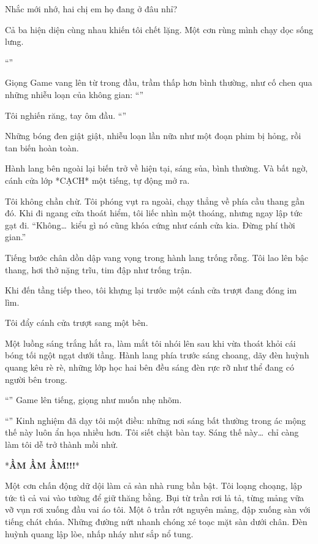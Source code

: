 \documentclass[../main.tex]{subfiles}
\begin{document}
Nhắc mới nhớ, hai chị em họ đang ở đâu nhỉ?

Cả ba hiện diện cùng nhau khiến tôi chết lặng. Một cơn rùng mình chạy dọc sống lưng.

``''

Giọng Game vang lên từ trong đầu, trầm thấp hơn bình thường, như cố chen qua những nhiễu loạn của không gian: ``''

Tôi nghiến răng, tay ôm đầu. ``''

Những bóng đen giật giật, nhiễu loạn lần nữa như một đoạn phim bị hỏng, rồi tan biến hoàn toàn.

Hành lang bên ngoài lại biến trở về hiện tại, sáng sủa, bình thường. Và bất ngờ, cánh cửa lớp *CẠCH* một tiếng, tự động mở ra.

Tôi không chần chừ. Tôi phóng vụt ra ngoài, chạy thẳng về phía cầu thang gần đó. Khi đi ngang cửa thoát hiểm, tôi liếc nhìn một thoáng, nhưng ngay lập tức gạt đi. ``Không\dots\ kiểu gì nó cũng khóa cứng như cánh cửa kia. Đừng phí thời gian.''

Tiếng bước chân dồn dập vang vọng trong hành lang trống rỗng. Tôi lao lên bậc thang, hơi thở nặng trĩu, tim đập như trống trận.

Khi đến tầng tiếp theo, tôi khựng lại trước một cánh cửa trượt đang đóng im lìm.

Tôi đẩy cánh cửa trượt sang một bên.

Một luồng sáng trắng hắt ra, làm mắt tôi nhói lên sau khi vừa thoát khỏi cái bóng tối ngột ngạt dưới tầng. Hành lang phía trước sáng choang, dãy đèn huỳnh quang kêu rè rè, những lớp học hai bên đều sáng đèn rực rỡ như thể đang có người bên trong.

``'' Game lên tiếng, giọng như muốn nhẹ nhõm.

``'' Kinh nghiệm đã dạy tôi một điều: những nơi sáng bất thường trong ác mộng thế này luôn ẩn họa nhiều hơn. Tôi siết chặt bàn tay. Sáng thế này\dots\ chỉ càng làm tôi dễ trở thành mồi nhử.

*\textbf{ẦM ẦM ẦM!!!}*

Một cơn chấn động dữ dội làm cả sàn nhà rung bần bật. Tôi loạng choạng, lập tức tì cả vai vào tường để giữ thăng bằng. Bụi từ trần rơi lả tả, từng mảng vữa vỡ vụn rơi xuống đầu vai áo tôi. Một ô trần rớt nguyên mảng, đập xuống sàn với tiếng chát chúa. Những đường nứt nhanh chóng xé toạc mặt sàn dưới chân. Đèn huỳnh quang lập lòe, nhấp nháy như sắp nổ tung.
\end{document}
